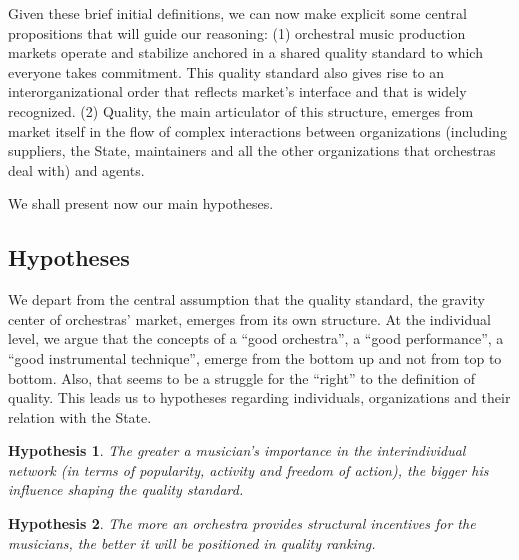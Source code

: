 \documentclass[a4paper, 12pt, openright, oneside, german, french, brazil, english]{abntex2}
\begin{document}
	Given these brief initial definitions, we can now make explicit some central propositions that will guide our reasoning: (1) orchestral music production markets operate and stabilize anchored in a shared quality standard to which everyone takes commitment. This quality standard also gives rise to an interorganizational order that reflects market's interface and that is widely recognized. (2) Quality, the main articulator of this structure, emerges from market itself in the flow of complex interactions between organizations (including suppliers, the State, maintainers and all the other organizations that orchestras deal with) and agents.
	
	
	We shall present now our main hypotheses.
	
	
	\subsection{Hypotheses}
	\newtheorem{hip}{Hypothesis}
	
	We depart from the central assumption that the quality standard, the gravity center of orchestras' market, emerges from its own structure. At the individual level, we argue that the concepts of a ``good orchestra'', a ``good performance'', a ``good instrumental technique'', emerge from the bottom up and not from top to bottom. Also, that seems to be a struggle for the ``right'' to the definition of quality. This leads us to hypotheses regarding individuals, organizations and their relation with the State.
	
	\begin{hip}
		The greater a musician's importance in the interindividual network (in terms of popularity, activity and freedom of action), the bigger his influence shaping the quality standard.
	\end{hip}
	
	
	
	\begin{hip}
		The more an orchestra provides structural incentives for the musicians, the better it will be positioned in quality ranking.
	\end{hip}
	
\end{document}
